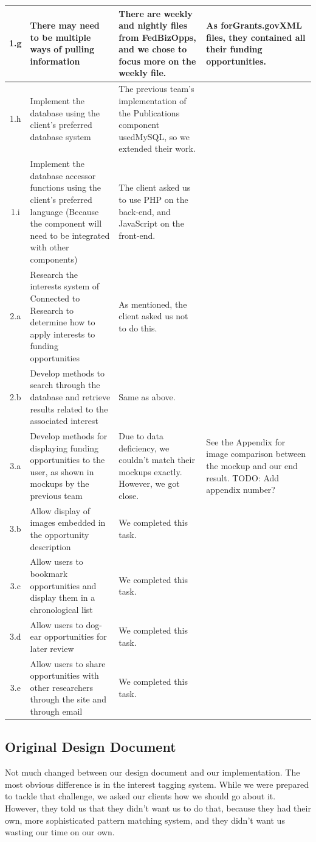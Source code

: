 \documentclass[onecolumn]{IEEEtran}
\begin{document}
\begin{tabularx}{\textwidth}{|c|X|X|X|}
    1.g & There may need to be multiple ways of pulling information & There are weekly and nightly files from FedBizOpps, and we chose to focus more on the weekly file. & As forGrants.govXML files, they contained all their funding opportunities. \\
    \hline
    1.h & Implement the database using the client's preferred database system & The previous team's implementation of the Publications component usedMySQL, so we extended their work. \\
    \hline
    1.i & Implement the database accessor functions using the client's preferred language (Because the component will need to be integrated with other components) & The client asked us to use PHP on the back-end, and JavaScript on the front-end. \\
    \hline
    2.a & Research the interests system of Connected to Research to determine how to apply interests to funding opportunities & As mentioned, the client asked us not to do this. \\
    \hline
    2.b & Develop methods to search through the database and retrieve results related to the associated interest & Same as above. \\
    \hline
    3.a & Develop methods for displaying funding opportunities to the user, as shown in mockups by the previous team & Due to data deficiency, we couldn't match their mockups exactly. However, we got close. & See the Appendix for image comparison between the mockup and our end result. TODO: Add appendix number? \\
    \hline
    3.b & Allow display of images embedded in the opportunity description & We completed this task. \\
    \hline
    3.c & Allow users to bookmark opportunities and display them in a chronological list & We completed this task. \\
    \hline
    3.d & Allow users to dog-ear opportunities for later review & We completed this task. \\
    \hline
    3.e & Allow users to share opportunities with other researchers through the site and through email & We completed this task. \\
    \hline
\end{tabularx}

\subsection{Original Design Document}
Not much changed between our design document and our implementation. The most obvious difference is in the interest tagging system. While we were prepared to tackle that challenge, we asked our clients how we should go about it. However, they told us that they didn't want us to do that, because they had their own, more sophisticated pattern matching system, and they didn't want us wasting our time on our own. 
\end{document}
